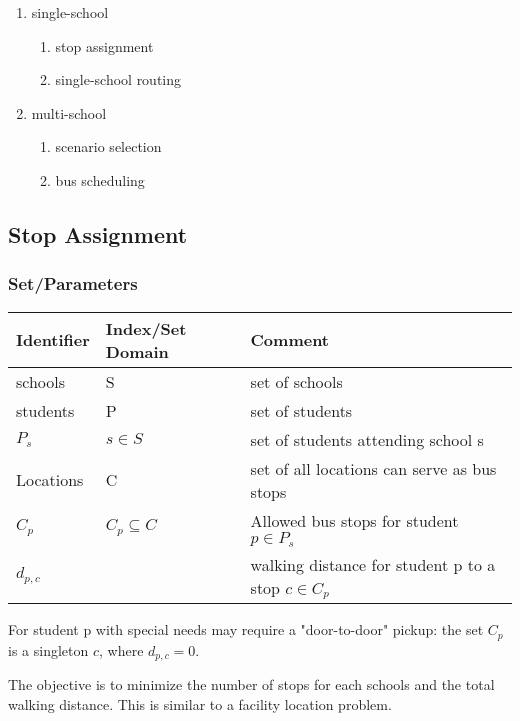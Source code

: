 \documentclass[11pt]{article}
\begin{document}
\begin{enumerate}
\item single-school

\begin{enumerate}
\item stop assignment
\item single-school routing
\end{enumerate}

\item multi-school

\begin{enumerate}
\item scenario selection
\item bus scheduling
\end{enumerate}
\end{enumerate}

\subsection{Stop Assignment}
\label{sec:org9cb1c70}
\subsubsection{Set/Parameters}
\label{sec:org9a8f920}
\begin{center}
\begin{tabular}{lll}
Identifier & Index/Set Domain & Comment\\
\hline
schools & S & set of schools\\
students & P & set of students\\
\(P_s\) & \(s \in S\) & set of students attending school s\\
Locations & C & set of all locations can serve as bus stops\\
\(C_p\) & \(C_p \subseteq C\) & Allowed bus stops for student \(p \in P_s\)\\
\(d_{p,c}\) &  & walking distance for student p to a stop \(c \in C_p\)\\
\end{tabular}
\end{center}

For student p with special needs may require a "door-to-door" pickup:
the set \(C_p\) is a singleton \({c}\), where \(d_{p,c} = 0\).

The objective is to minimize the number of stops for each schools and
the total walking distance. This is similar to a facility location
problem.
\end{document}
